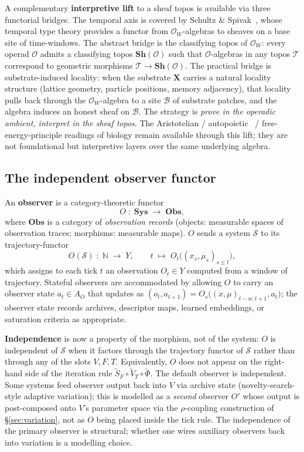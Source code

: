 \documentclass[journal]{IEEEtran}
\theoremstyle{plain}
\theoremstyle{definition}
\theoremstyle{plain}
\newcommand{\X}{\mathbf{X}}
\begin{document}
A complementary \textbf{interpretive lift} to a sheaf topos is available
via three functorial bridges. The temporal axis is covered by Schultz
\& Spivak~\cite{schultz2020sheaves}, whose temporal type theory provides
a functor from $\mathcal{O}_W$-algebras to sheaves on a base site of
time-windows. The abstract bridge is the classifying topos of
$\mathcal{O}_W$: every operad $\mathcal{O}$ admits a classifying topos
$\mathbf{Sh}(\mathcal{O})$ such that $\mathcal{O}$-algebras in any topos
$\mathcal{T}$ correspond to geometric morphisms $\mathcal{T} \to
\mathbf{Sh}(\mathcal{O})$. The practical bridge is substrate-induced
locality: when the substrate $\X$ carries a natural locality structure
(lattice geometry, particle positions, memory adjacency), that locality
pulls back through the $\mathcal{O}_W$-algebra to a site $\mathcal{B}$ of
substrate patches, and the algebra induces an honest sheaf on
$\mathcal{B}$. The strategy is \emph{prove in the operadic ambient,
interpret in the sheaf topos}. The Aristotelian /
autopoietic~\cite{maturana1980autopoiesis} / free-energy-principle
readings of biology remain available through this lift; they are not
foundational but interpretive layers over the same underlying algebra.

\subsection{The independent observer functor}\label{sec:observer}

An \textbf{observer} is a category-theoretic functor
\[
  O \;:\; \mathbf{Sys} \;\longrightarrow\; \mathbf{Obs},
\]
where $\mathbf{Obs}$ is a category of \emph{observation records} (objects:
measurable spaces of observation traces; morphisms: measurable maps). $O$
sends a system $\mathcal{S}$ to its trajectory-functor
\[
  O(\mathcal{S}) \;:\; \mathbb{N} \;\longrightarrow\; Y,
  \qquad t \;\longmapsto\; O_t\!\big((x_s,\mu_s)_{s\le t}\big),
\]
which assigns to each tick $t$ an observation $O_t \in Y$ computed from a
window of trajectory. Stateful observers are accommodated by allowing $O$
to carry an observer state $a_t \in A_O$ that updates as
$(o_t, a_{t+1}) = O_s\big((x,\mu)_{t-w:t+1}, a_t\big)$; the observer state
records archives, descriptor maps, learned embeddings, or saturation
criteria as appropriate.

\textbf{Independence} is now a property of the morphism, not of the
system: $O$ is independent of $\mathcal{S}$ when it factors through the
trajectory functor of $\mathcal{S}$ rather than through any of the slots
$V, F, T$. Equivalently, $O$ does not appear on the right-hand side of
the iteration rule
$\widetilde S_F \circ \widetilde V_T \circ \widetilde \Phi$. The default
observer is independent. Some systems feed observer output back into
$V$ via archive state (novelty-search-style adaptive variation); this is
modelled as a \emph{second} observer $O'$ whose output is post-composed
onto $V$'s parameter space via the $\rho$-coupling construction of
\S\ref{sec:variation}, not as $O$ being placed inside the tick rule. The
independence of the primary observer is structural; whether one wires
auxiliary observers back into variation is a modelling choice.
\end{document}
